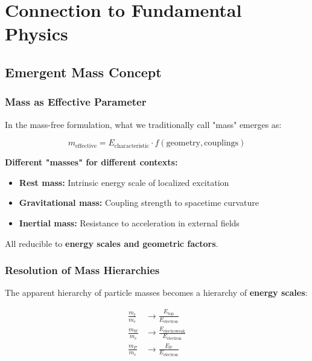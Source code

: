\documentclass[12pt,a4paper]{article}
\newcommand{\EP}{E_{\text{P}}}
\begin{document}
	\section{Connection to Fundamental Physics}
	\label{sec:fundamental_connection}
	
	\subsection{Emergent Mass Concept}
	\label{subsec:emergent_mass}
	
	\subsubsection{Mass as Effective Parameter}
	
	In the mass-free formulation, what we traditionally call "mass" emerges as:
	
	\begin{equation}
		m_{\text{effective}} = E_{\text{characteristic}} \cdot f(\text{geometry}, \text{couplings})
		\label{eq:emergent_mass}
	\end{equation}
	
	\textbf{Different "masses" for different contexts:}
	\begin{itemize}
		\item \textbf{Rest mass:} Intrinsic energy scale of localized excitation
		\item \textbf{Gravitational mass:} Coupling strength to spacetime curvature  
		\item \textbf{Inertial mass:} Resistance to acceleration in external fields
	\end{itemize}
	
	All reducible to \textbf{energy scales and geometric factors}.
	
	\subsubsection{Resolution of Mass Hierarchies}
	
	The apparent hierarchy of particle masses becomes a hierarchy of \textbf{energy scales}:
	
	\begin{align}
		\frac{m_t}{m_e} &\rightarrow \frac{E_{\text{top}}}{E_{\text{electron}}} \\
		\frac{m_W}{m_e} &\rightarrow \frac{E_{\text{electroweak}}}{E_{\text{electron}}} \\
		\frac{m_P}{m_e} &\rightarrow \frac{\EP}{E_{\text{electron}}}
	\end{align}
	
\end{document}
